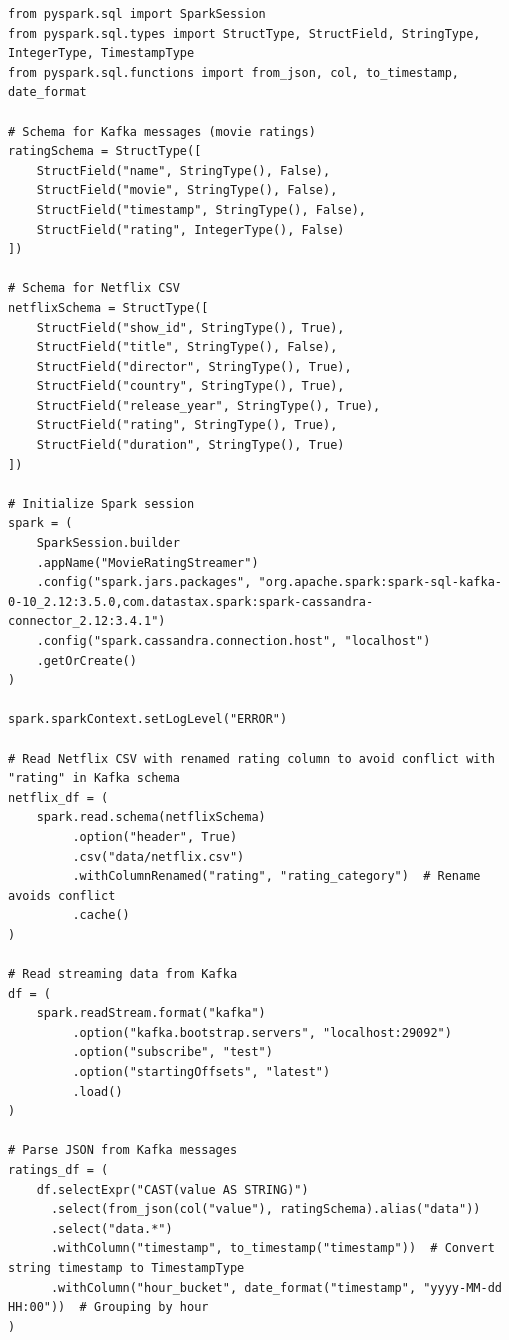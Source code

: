 \documentclass[a4paper,11pt]{article}
\theoremstyle{mytheor}
\begin{document}
\begin{lstlisting}[label={list:second},caption=cassandra-spark-streaming-example.py.]
from pyspark.sql import SparkSession
from pyspark.sql.types import StructType, StructField, StringType, IntegerType, TimestampType
from pyspark.sql.functions import from_json, col, to_timestamp, date_format

# Schema for Kafka messages (movie ratings)
ratingSchema = StructType([
    StructField("name", StringType(), False),
    StructField("movie", StringType(), False),
    StructField("timestamp", StringType(), False),
    StructField("rating", IntegerType(), False)
])

# Schema for Netflix CSV
netflixSchema = StructType([
    StructField("show_id", StringType(), True),
    StructField("title", StringType(), False),
    StructField("director", StringType(), True),
    StructField("country", StringType(), True),
    StructField("release_year", StringType(), True),
    StructField("rating", StringType(), True),
    StructField("duration", StringType(), True)
])

# Initialize Spark session
spark = (
    SparkSession.builder
    .appName("MovieRatingStreamer")
    .config("spark.jars.packages", "org.apache.spark:spark-sql-kafka-0-10_2.12:3.5.0,com.datastax.spark:spark-cassandra-connector_2.12:3.4.1")
    .config("spark.cassandra.connection.host", "localhost")
    .getOrCreate()
)

spark.sparkContext.setLogLevel("ERROR")

# Read Netflix CSV with renamed rating column to avoid conflict with "rating" in Kafka schema
netflix_df = (
    spark.read.schema(netflixSchema)
         .option("header", True)
         .csv("data/netflix.csv")
         .withColumnRenamed("rating", "rating_category")  # Rename avoids conflict
         .cache()
)

# Read streaming data from Kafka
df = (
    spark.readStream.format("kafka")
         .option("kafka.bootstrap.servers", "localhost:29092")
         .option("subscribe", "test")
         .option("startingOffsets", "latest")
         .load()
)

# Parse JSON from Kafka messages
ratings_df = (
    df.selectExpr("CAST(value AS STRING)")
      .select(from_json(col("value"), ratingSchema).alias("data"))
      .select("data.*")
      .withColumn("timestamp", to_timestamp("timestamp"))  # Convert string timestamp to TimestampType
      .withColumn("hour_bucket", date_format("timestamp", "yyyy-MM-dd HH:00"))  # Grouping by hour
)


\end{lstlisting}
\end{document}
